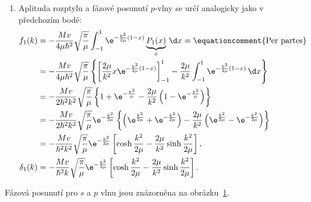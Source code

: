 \begin{solution}
\begin{enumerate}
		\item
			Aplituda rozptylu a fázové posunutí $p$-vlny se určí analogicky jako v předchozím bodě:
			\begin{align}
				f_{1}(k)
					&=-\frac{Mv}{4\mu\hbar^{2}}\sqrt{\frac{\pi}{\mu}}\int_{-1}^{1}\e^{-\frac{k^{2}}{2\mu}(1-x)}\underbrace{P_{1}(x)}_{x}\,\d x=\equationcomment{\text{Per partes}}\nonumber\\			
					&=-\frac{Mv}{4\mu\hbar^{2}}\sqrt{\frac{\pi}{\mu}}\left\{\left[\frac{2\mu}{k^{2}}x\e^{-\frac{k^{2}}{2\mu}(1-x)}\right]_{-1}^{1}-\frac{2\mu}{k^{2}}\int_{-1}^{1}\e^{-\frac{k^{2}}{2\mu}(1-x)}\,\d x\right\}\nonumber\\
					&=-\frac{Mv}{2\hbar^{2}k^{2}}\sqrt{\frac{\pi}{\mu}}\left\{1+\e^{-\frac{k^{2}}{\mu}}-\frac{2\mu}{k^{2}}\left(1-\e^{-\frac{k^{2}}{\mu}}\right)\right\}\nonumber\\
					&=-\frac{Mv}{2\hbar^{2}k^{2}}\sqrt{\frac{\pi}{\mu}}\e^{-\frac{k^{2}}{2\mu}}\left\{\left(\e^{\frac{k^{2}}{2\mu}}+\e^{-\frac{k^{2}}{2\mu}}\right)-\frac{2\mu}{k^{2}}\left(\e^{\frac{k^{2}}{2\mu}}-\e^{-\frac{k^{2}}{2\mu}}\right)\right\}\nonumber\\
					&=-\frac{Mv}{\hbar^{2}k^{2}}\sqrt{\frac{\pi}{\mu}}\e^{-\frac{k^{2}}{2\mu}}\left[\cosh{\frac{k^{2}}{2\mu}}-\frac{2\mu}{k^{2}}\sinh{\frac{k^{2}}{2\mu}}\right],\\
				\delta_{1}(k)
					&=-\frac{Mv}{\hbar^{2}k}\sqrt{\frac{\pi}{\mu}}\e^{-\frac{k^{2}}{2\mu}}\left[\cosh{\frac{k^{2}}{2\mu}}-\frac{2\mu}{k^{2}}\sinh{\frac{k^{2}}{2\mu}}\right].
			\end{align}		
	\end{enumerate}
	
	\begin{figure}[!hbp]
		\centering
        \label{fig:GaussianScattering}
	\end{figure}		
	
	Fázová posunutí pro $s$ a $p$ vlnu jsou znázorněna na obrázku~\ref{fig:GaussianScattering}.
\end{solution}
